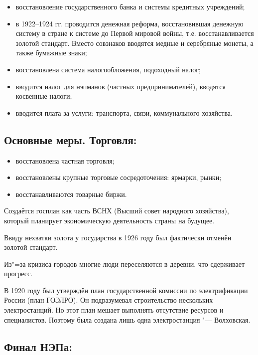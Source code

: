 \begin{itemize}
    \item восстановление государственного банка и системы кредитных учреждений;
    \item в 1922--1924 гг. проводится денежная реформа, восстановившая денежную систему в стране к системе до Первой мировой войны, т.е. восстанавливается золотой стандарт. Вместо совзнаков вводятся медные и серебряные монеты, а также бумажные знаки;
    \item восстановлена система налогообложения, подоходный налог;
    \item вводится налог для нэпманов (частных предпринимателей), вводятся косвенные налоги;
    \item вводится плата за услуги: транспорта, связи, коммунального хозяйства.
\end{itemize}

\subsection{Основные меры. Торговля:}

\begin{itemize}
    \item восстановлена частная торговля;
    \item восстановлены крупные торговые сосредоточения: ярмарки, рынки;
    \item восстанавливаются товарные биржи.
\end{itemize}

\vspace{0.5cm}

Создаётся госплан как часть ВСНХ (Высший совет народного хозяйства), который планирует экономическую деятельность страны на будущее. 

Ввиду нехватки золота у государства в 1926 году был фактически отменён золотой стандарт.

Из"=за кризиса городов многие люди переселяются в деревни, что сдерживает прогресс.

В 1920 году был утверждён план государственной комиссии по электрификации России (план ГОЭЛРО). Он подразумевал строительство нескольких электростанций. Но этот план мешает выполнять отсутствие ресурсов и специалистов. Поэтому была создана лишь одна электростанция "--- Волховская.

\subsection{Финал НЭПа:}

